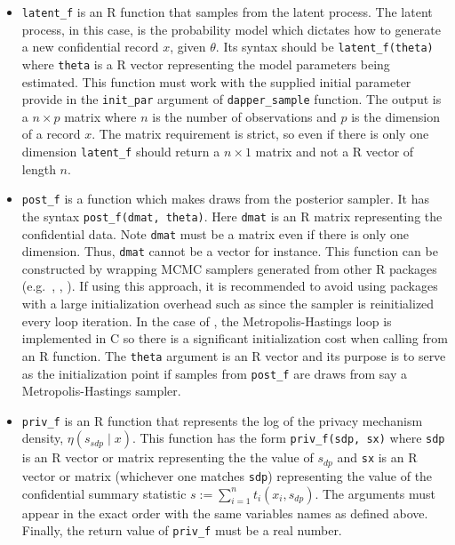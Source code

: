 \begin{itemize}
\item
  \texttt{latent\_f} is an R function that samples from the latent process.
  The latent process, in this case, is the probability model which dictates how
  to generate a new confidential record \(x\), given \(\theta\).
  Its syntax should be \texttt{latent\_f(theta)} where \texttt{theta} is a R vector
  representing the model parameters being estimated. This function
  must work with the supplied initial parameter provide in the \texttt{init\_par}
  argument of \texttt{dapper\_sample} function. The output is a \(n \times p\) matrix
  where \(n\) is the number of observations and \(p\) is the dimension of a record \(x\).
  The matrix requirement is strict, so even if there is only one dimension
  \texttt{latent\_f} should return a \(n \times 1\) matrix and not a R vector of length \(n\).
\item
  \texttt{post\_f} is a function which makes draws from the posterior sampler. It has
  the syntax \texttt{post\_f(dmat,\ theta)}. Here \texttt{dmat} is an R matrix representing the confidential data.
  Note \texttt{dmat} must be a matrix even if there is only one dimension. Thus, \texttt{dmat} cannot
  be a vector for instance. This function can be constructed by wrapping MCMC samplers generated from other R packages
  (e.g.~, , ).
  If using this approach, it is recommended to avoid using packages
  with a large initialization overhead such as  since the sampler is reinitialized
  every loop iteration. In the case of ,
  the Metropolis-Hastings loop is implemented in C so there is a significant initialization cost
  when calling from an R function. The \texttt{theta} argument is an R vector and its purpose is
  to serve as the initialization point if samples from \texttt{post\_f} are draws
  from say a Metropolis-Hastings sampler.
\item
  \texttt{priv\_f} is an R function that represents the log of the privacy mechanism density, \(\eta(s_{sdp} \mid x)\).
  This function has the form \texttt{priv\_f(sdp,\ sx)} where \texttt{sdp} is an R vector or matrix representing the
  the value of \(s_{dp}\) and \texttt{sx} is an R vector or matrix (whichever one matches \texttt{sdp}) representing the value of the confidential summary statistic
  \(s := \sum_{i=1}^{n} t_i(x_i, s_{dp})\).
  The arguments must appear in the exact order with the same variables names as defined above.
  Finally, the return value of \texttt{priv\_f} must be a real number.

\end{itemize}
